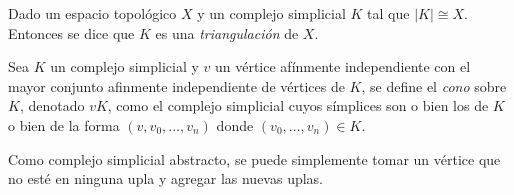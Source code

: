 \documentclass[HS.tex]{subfiles}
\begin{document}
\begin{defi}
Dado un espacio topológico $X$ y un complejo simplicial $K$ tal que $|K|\cong X$. Entonces se dice que $K$ es una \emph{triangulación} de $X$. 
\end{defi}

\begin{defi}
Sea $K$ un complejo simplicial y $v$ un vértice afínmente independiente con el mayor conjunto afinmente independiente de vértices de $K$, se define el \emph{cono} sobre $K$, denotado $vK$,  como el complejo simplicial cuyos símplices son o bien los de $K$ o bien de la forma $(v,v_0,\dots, v_n)$ donde $(v_0,\dots, v_n)\in K$. 
\end{defi}

\begin{nota}
Como complejo simplicial abstracto, se puede simplemente tomar un vértice que no esté en ninguna upla y agregar las nuevas uplas.
\end{nota}
\end{document}
